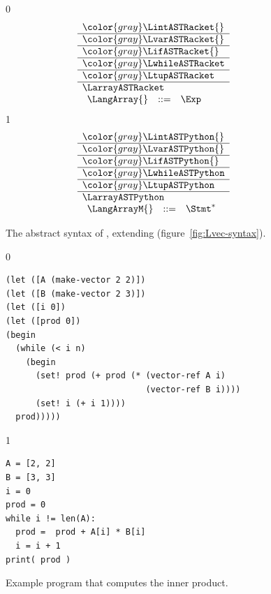\documentclass[7x10]{TimesAPriori_MIT}%
\newcommand{\gray}[1]{{\color{gray} #1}}
\def\racketEd{0}
\def\pythonEd{1}
\def\edition{1}
\newcommand{\pythonColor}[0]{}
\numberwithin{theorem}{chapter}
\numberwithin{definition}{chapter}
\numberwithin{equation}{chapter}
\begin{document}
\begin{figure}[tp]
\centering
\begin{tcolorbox}[colback=white]
    \small
{\if\edition\racketEd    
\[
\begin{array}{l}
  \gray{\LintASTRacket{}} \\ \hline
  \gray{\LvarASTRacket{}} \\ \hline
  \gray{\LifASTRacket{}} \\ \hline
  \gray{\LwhileASTRacket} \\ \hline
  \gray{\LtupASTRacket} \\ \hline
  \LarrayASTRacket \\
\begin{array}{lcl}
  \LangArray{} &::=& \Exp
\end{array}
\end{array}
\]
\fi}
{\if\edition\pythonEd\pythonColor    
\[
\begin{array}{l}
  \gray{\LintASTPython{}} \\ \hline
  \gray{\LvarASTPython{}} \\ \hline
  \gray{\LifASTPython{}} \\ \hline
  \gray{\LwhileASTPython} \\ \hline
  \gray{\LtupASTPython} \\ \hline
  \LarrayASTPython \\
\begin{array}{rcl}
  \LangArrayM{} &::=& \Stmt^{*}
\end{array}
\end{array}
\]
\fi}
\end{tcolorbox}
\caption{The abstract syntax of \LangArray{}, extending \LangVec{} (figure~\ref{fig:Lvec-syntax}).}
\label{fig:Lvecof-syntax}
\end{figure}


\begin{figure}[tp]
\begin{tcolorbox}[colback=white]  
{\if\edition\racketEd
\begin{lstlisting}
(let ([A (make-vector 2 2)])
(let ([B (make-vector 2 3)])
(let ([i 0])
(let ([prod 0])
(begin
  (while (< i n)
    (begin
      (set! prod (+ prod (* (vector-ref A i)
                            (vector-ref B i))))
      (set! i (+ i 1))))
  prod)))))
\end{lstlisting}
\fi}
{\if\edition\pythonEd\pythonColor    
\begin{lstlisting}
A = [2, 2]
B = [3, 3]
i = 0
prod = 0
while i != len(A):
  prod =  prod + A[i] * B[i]
  i = i + 1
print( prod )
\end{lstlisting}
\fi}
\end{tcolorbox}

\caption{Example program that computes the inner product.}
\label{fig:inner_product}
\end{figure}
\end{document}
